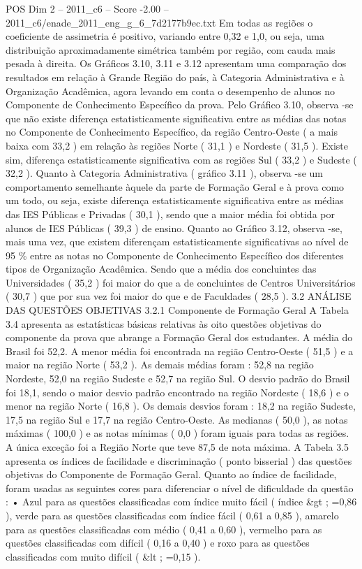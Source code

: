\begin{textsample}{POS Dim 2 – 2011\_c6 – Score -2.00 – 2011\_c6/enade\_2011\_eng\_g\_6\_7d2177b9ec.txt}
Em todas as regiões o coeficiente de assimetria é positivo, variando entre 0,32 e 1,0, ou seja, uma distribuição aproximadamente simétrica também por região, com cauda mais pesada à direita.
Os Gráficos 3.10, 3.11 e 3.12 apresentam uma comparação dos resultados em relação à Grande Região do país, à Categoria Administrativa e à Organização Acadêmica, agora levando em conta o desempenho de alunos no Componente de Conhecimento Específico da prova.
Pelo Gráfico 3.10, observa -se que não existe diferença estatisticamente significativa entre as médias das notas no Componente de Conhecimento Específico, da região Centro-Oeste ( a mais baixa com 33,2 ) em relação às regiões Norte ( 31,1 ) e Nordeste ( 31,5 ).
Existe sim, diferença estatisticamente significativa com as regiões Sul ( 33,2 ) e Sudeste ( 32,2 ).
Quanto à Categoria Administrativa ( gráfico 3.11 ), observa -se um comportamento semelhante àquele da parte de Formação Geral e à prova como um todo, ou seja, existe diferença estatisticamente significativa entre as médias das IES Públicas e Privadas ( 30,1 ), sendo que a maior média foi obtida por alunos de IES Públicas ( 39,3 ) de ensino.
Quanto ao Gráfico 3.12, observa -se, mais uma vez, que existem diferençam estatisticamente significativas ao nível de 95 \% entre as notas no Componente de Conhecimento Específico dos diferentes tipos de Organização Acadêmica.
Sendo que a média dos concluintes das Universidades ( 35,2 ) foi maior do que a de concluintes de Centros Universitários ( 30,7 ) que por sua vez foi maior do que e de Faculdades ( 28,5 ). 3.2 ANÁLISE DAS QUESTÕES OBJETIVAS 3.2.1 Componente de Formação Geral A Tabela 3.4 apresenta as estatísticas básicas relativas às oito questões objetivas do componente da prova que abrange a Formação Geral dos estudantes.
A média do Brasil foi 52,2.
A menor média foi encontrada na região Centro-Oeste ( 51,5 ) e a maior na região Norte ( 53,2 ).
As demais médias foram : 52,8 na região Nordeste, 52,0 na região Sudeste e 52,7 na região Sul.
O desvio padrão do Brasil foi 18,1, sendo o maior desvio padrão encontrado na região Nordeste ( 18,6 ) e o menor na região Norte ( 16,8 ).
Os demais desvios foram : 18,2 na região Sudeste, 17,5 na região Sul e 17,7 na região Centro-Oeste.
As medianas ( 50,0 ), as notas máximas ( 100,0 ) e as notas mínimas ( 0,0 ) foram iguais para todas as regiões.
A única exceção foi a Região Norte que teve 87,5 de nota máxima.
A Tabela 3.5 apresenta os índices de facilidade e discriminação ( ponto bisserial ) das questões objetivas do Componente de Formação Geral.
Quanto ao índice de facilidade, foram usadas as seguintes cores para diferenciar o nível de dificuldade da questão : • Azul para as questões classificadas com índice muito fácil ( índice \&gt ; =0,86 ), verde para as questões classificadas com índice fácil ( 0,61 a 0,85 ), amarelo para as questões classificadas com médio ( 0,41 a 0,60 ), vermelho para as questões classificadas com difícil ( 0,16 a 0,40 ) e roxo para as questões classificadas com muito difícil ( \&lt ; =0,15 ).

\end{textsample}

